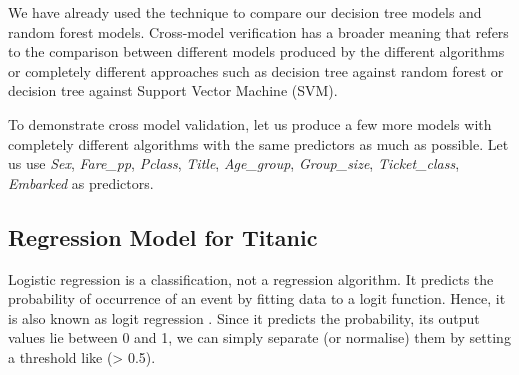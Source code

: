 \documentclass[
]{book}
\begin{document}
We have already used the technique to compare our decision tree models and random forest models. Cross-model verification has a broader meaning that refers to the comparison between different models produced by the different algorithms or completely different approaches such as decision tree against random forest or decision tree against Support Vector Machine (SVM).

To demonstrate cross model validation, let us produce a few more models with completely different algorithms with the same predictors as much as possible. Let us use \emph{Sex}, \emph{Fare\_pp}, \emph{Pclass}, \emph{Title}, \emph{Age\_group}, \emph{Group\_size}, \emph{Ticket\_class}, \emph{Embarked} as predictors.

\hypertarget{regression-model-for-titanic}{%
\subsection*{Regression Model for Titanic}\label{regression-model-for-titanic}}


Logistic regression is a classification, not a regression algorithm. It predicts the probability of occurrence of an event by fitting data to a logit function. Hence, it is also known as logit regression \citep{analyticsvidhya2015}. Since it predicts the probability, its output values lie between 0 and 1, we can simply separate (or normalise) them by setting a threshold like (\textgreater{} 0.5).
\end{document}
